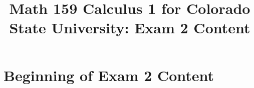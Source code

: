 \documentclass[10pt,handout,twocolumn,twoside,wordchoicegiven]{xourse}
\title{Math 159 Calculus 1 for Colorado State University: Exam 2 Content}
\begin{document}
\maketitle

\setcounter{tocdepth}{2}

\part{Beginning of Exam 2 Content}

\begin{comment}

\chapterstyle
\begin{graded}{167}
\activity{maximumsAndMinimums/titlePage.tex}
\end{graded}
\sectionstyle
\begin{graded}{81}
\activity{maximumsAndMinimums/breakGround.tex}
\end{graded}
\begin{graded}{484}
\activity{maximumsAndMinimums/digInMaximumsAndMinimums.tex}
\end{graded}
\begin{graded}{1110}
\activity{exercisesForMath160/ExMaxMin.tex}
\end{graded}
\begin{graded}{726}
\activity{maximumsAndMinimums/digIn1stDerivTest.tex}
\end{graded}
\begin{graded}{5409}
\activity{exercisesForMath160/Ex1stDerivTest.tex}
\end{graded}
\begin{graded}{1614}
\activity{maximumsAndMinimums/digInConcavityAnd2ndDerivTest.tex}
\end{graded}
\begin{graded}{1775}
\activity{exercisesForMath160/Ex2ndDerivTest.tex}
\end{graded}


\chapterstyle
\begin{graded}{167}
\activity{conceptsOfGraphingFunctions/titlePage.tex}
\end{graded}
\sectionstyle
\begin{graded}{161}
\activity{conceptsOfGraphingFunctions/breakGround.tex}
\end{graded}
\begin{graded}{403}
\activity{conceptsOfGraphingFunctions/digInConceptsOfGraphingFunctions.tex}
\end{graded}


\end{comment}
\end{document}

